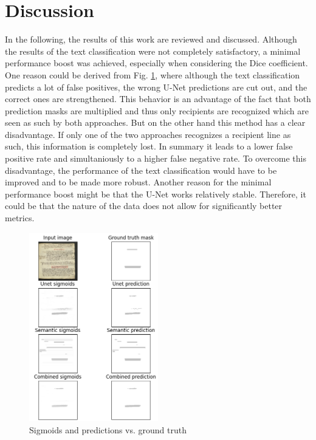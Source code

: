 \documentclass[conference]{IEEEtran}
\begin{document}
\section{Discussion}\label{discussion}
In the following, the results of this work are reviewed and discussed. Although the results of the text classification were not completely satisfactory, a minimal performance boost was achieved, especially when considering the Dice coefficient. One reason could be derived from Fig. \ref{overview_preds}, where although the text classification predicts a lot of false positives, the wrong U-Net predictions are cut out, and the correct ones are strengthened. This behavior is an advantage of the fact that both prediction masks are multiplied and thus only recipients are recognized which are seen as such by both approaches. But on the other hand this method has a clear disadvantage. If only one of the two approaches recognizes a recipient line as such, this information is completely lost. In summary it leads to a lower false positive rate and simultaniously to a higher false negative rate. To overcome this disadvantage, the performance of the text classification would have to be improved and to be made more robust. Another reason for the minimal performance boost might be that the U-Net works relatively stable. Therefore, it could be that the nature of the data does not allow for significantly better metrics.

\begin{figure}[htbp]
    \centering
    \includegraphics[width=0.5\textwidth]{figures/overview_preds.png}
    \caption{Sigmoids and predictions vs. ground truth}
    \label{overview_preds}
\end{figure}
\end{document}
